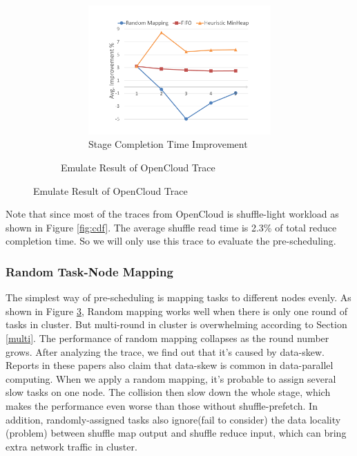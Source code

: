 \begin{figure}
\begin{minipage}{0.65\linewidth}
\begin{figure}[H]
			\begin{subfigure}{0.5\textwidth}
				\includegraphics[width=\linewidth]{fig/sim}
				\caption{Stage Completion Time Improvement}
				\label{fig:sim}
			\end{subfigure}	
			\caption{Emulate Result of OpenCloud Trace}
		\end{figure}
	\end{minipage}
\end{figure}
Note that since most of the traces from OpenCloud is shuffle-light workload as shown in Figure \ref{fig:cdf}. The average shuffle read time is 2.3\% of total reduce completion time. So we will only use this trace to evaluate the pre-scheduling. 
\subsubsection{Random Task-Node Mapping}\label{randomassign}
The simplest way of pre-scheduling is mapping tasks to different nodes evenly. As shown in Figure \ref{fig:sim}, Random mapping works well when there is only one round of tasks in cluster. But multi-round in cluster is overwhelming according to Section \ref{multi}. The performance of random mapping collapses as the round number grows. After analyzing the trace, we find out that it's caused by data-skew. Reports in these papers\cite{skewtune, reining, gufler2012load} also claim that data-skew is common in data-parallel computing. When we apply a random mapping, it's probable to assign several slow tasks on one node. The collision then slow down the whole stage, which makes the performance even worse than those without shuffle-prefetch. In addition, randomly-assigned tasks also ignore(fail to consider) the data locality (problem) between shuffle map output and shuffle reduce input, which can bring extra network traffic in cluster. 


